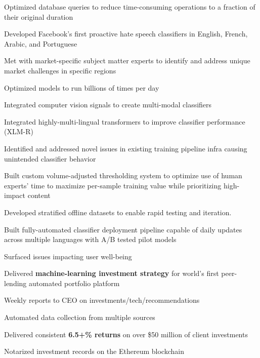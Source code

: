 \documentclass[]{resume}
\begin{document}
\begin{minipage}[t]{1.0\textwidth}
\begin{tightemize}
    \columnbreak

    \item Optimized database queries to reduce time-consuming operations to a fraction of their original duration
    
\end{tightemize}

\begin{tightemize}
\item Developed Facebook's first proactive hate speech classifiers in English, French, Arabic, and Portuguese
\item Met with market-specific subject matter experts to identify and address unique market challenges in specific regions
\item Optimized models to run billions of times per day
\item Integrated computer vision signals to create multi-modal classifiers
\item Integrated highly-multi-lingual transformers to improve classifier performance (XLM-R)
\item Identified and addressed novel issues in existing training pipeline infra causing unintended classifier behavior

\columnbreak

\item Built custom volume-adjusted thresholding system to optimize use of human experts' time to maximize per-sample training value while prioritizing high-impact content
\item Developed stratified offline datasets to enable rapid testing and iteration.
\item Built fully-automated classifier deployment pipeline capable of daily updates 
across multiple languages with A/B tested pilot models
\item Surfaced issues impacting user well-being
\end{tightemize}

\sectionsep

\begin{tightemize}
\item Delivered \textbf{machine-learning investment strategy} for world's first peer-lending automated portfolio platform
\item Weekly reports to CEO on investments/tech/recommendations
\item Automated data collection from multiple sources
\item Delivered consistent  \textbf{6.5+\% returns} on over \$50 million of client investments
\item Notarized investment records on the Ethereum blockchain
\end{tightemize}
\sectionsep


\end{minipage}
\end{document}
